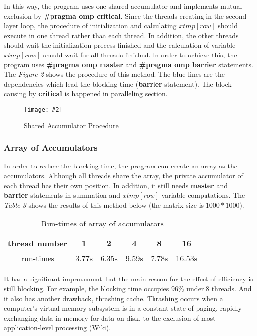 \documentclass[10pt, a4paper]{article}
\newcommand{\figuremacro}[5]{
    \begin{figure}[#1]
        \centering
        \texttt{[image: \#2]}
        \caption[#3]{\textbf{#3}#4}
        \label{fig:#2}
    \end{figure}
}
\begin{document}
    In this way, the program uses one shared accumulator and implements mutual exclusion by \textbf{\#pragma omp critical}. Since the threads creating in the second layer loop, the procedure of initialization and calculating $xtmp[row]$ should execute in one thread rather than each thread. In addition, the other threads should wait the initialization process finished and the calculation of variable $xtmp[row]$ should wait for all threads finished. In order to achieve this, the program uses \textbf{\#pragma omp master} and \textbf{\#pragma omp barrier} statements. The \textit{Figure-2} shows the procedure of this method. The blue lines are the dependencies which lead the blocking time (\textbf{barrier} statement). The block causing by \textbf{critical} is happened in paralleling section. 
	
	\figuremacro{h}{figure2}{}{ Shared Accumulator Procedure }{1.0}
    
	\subsubsection{Array of Accumulators}
	
    In order to reduce the blocking time, the program can create an array as the accumulators. Although all threads share the array, the private accumulator of each thread has their own position. In addition, it still needs \textbf{master} and \textbf{barrier} statements in summation and $xtmp[row]$ variable computations. The \textit{Table-3} shows the results of this method below (the matrix size is $1000*1000$).
	
	\begin{table}[h!]
    \centering
    \begin{tabular}{ |c|c|c|c|c|c| } 
     \hline
     thread number & 1 & 2 & 4 & 8 & 16\\ \hline
     run-times & 3.77s & 6.35s & 9.59s & 7.78s & 16.53s \\ \hline
     
    \end{tabular}
    \caption{Run-times of array of accumulators}
    \end{table}
    
    It has a significant improvement, but the main reason for the effect of efficiency is still blocking. For example, the blocking time occupies $96\%$ under 8 threads. And it also has another drawback, thrashing cache. Thrashing occurs when a computer's virtual memory subsystem is in a constant state of paging, rapidly exchanging data in memory for data on disk, to the exclusion of most application-level processing (Wiki).
	
\end{document}
